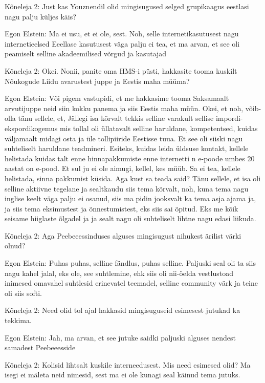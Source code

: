 Kõneleja 2:
Just kas Youznendil olid mingisugused selged grupikaagus eestlasi nagu palju küljes käis?
                 
Egon Elstein:
Ma ei usu, et ei ole, sest.
Noh, selle internetikasutusest nagu internetieelsed Eeellase kasutusest väga palju ei tea, et ma arvan, et see oli peamiselt selline akadeemilised võrgud ja kasutajad
                 
Kõneleja 2:
Okei. Nonii, panite oma HMS-i püsti, hakkasite tooma kuskilt Nõukogude Liidu avarustest juppe ja Eestis maha müüma?
                 
Egon Elstein:
Või pigem vastupidi, et me hakkasime tooma Saksamaalt arvutijuppe neid siin kokku panema ja siis Eestis maha müün. Okei, et noh, võib-olla tänu sellele, et,
Jällegi isa kõrvalt tekkis selline varakult sellise impordi-ekspordikogemus mis tollal oli üllatavalt selline haruldane, kompetentsed, kuidas väljamaalt midagi osta ja üle tollipiiride Eestisse tuua. Et see oli siiski nagu suhteliselt haruldane teadmineri. Esiteks, kuidas leida üldsuse kontakt, kellele helistada kuidas talt enne hinnapakkumiste enne internetti n e-poode umbes 20 aastat on e-pood. Et sul ju ei ole aimugi, kellel, kes müüb. Sa ei tea, kellele helistada, sinna pakkumist küsida. Aga kust sa teada said? Tänu sellele, et isa oli selline aktiivne tegelane ja sealtkaudu siis tema kõrvalt, noh, kuna tema nagu inglise keelt väga palju ei osanud, siis ma pidin jooksvalt ka tema asja ajama ja, ja siis tema eksimustest ja õnnestumistest, eks siis sai õpitud. Eks me kõik seisame hiiglaste õlgadel ja ja sealt nagu oli suhteliselt lihtne nagu edasi liikuda.
                 
Kõneleja 2:
Aga Peebeeessinduses alguses mingisugust nihukest ärilist värki olnud?
                 
Egon Elstein:
Puhas puhas, selline fändlus, puhas selline. Paljuski seal oli ta siis nagu kahel jalal, eks ole, see suhtlemine, ehk siis oli nii-öelda vestlustoad inimesed omavahel suhtlesid erinevatel teemadel, selline community värk ja teine oli siis softi.
                 
Kõneleja 2:
Need olid tol ajal hakkasid mingisuguseid esimesest jutukad ka tekkima.
                 
Egon Elstein:
Jah, ma arvan, et see jutuke saidki paljuski alguses nendest samadest Peebeeesside
                 
Kõneleja 2:
Kolisid lihtsalt kuskile interneedusest. Mis need esimesed olid? Ma isegi ei mäleta neid nimesid, sest ma ei ole kunagi seal käinud tema jutuks.
                 
